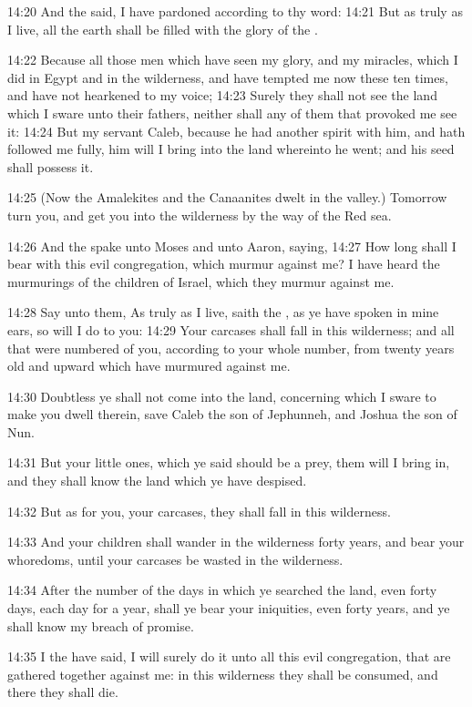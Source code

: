 14:20 And the \LORD said, I have pardoned according to thy word: 14:21
But as truly as I live, all the earth shall be filled with the glory
of the \LORD.

14:22 Because all those men which have seen my glory, and my miracles,
which I did in Egypt and in the wilderness, and have tempted me now
these ten times, and have not hearkened to my voice; 14:23 Surely they
shall not see the land which I sware unto their fathers, neither shall
any of them that provoked me see it: 14:24 But my servant Caleb,
because he had another spirit with him, and hath followed me fully,
him will I bring into the land whereinto he went; and his seed shall
possess it.

14:25 (Now the Amalekites and the Canaanites dwelt in the valley.)
Tomorrow turn you, and get you into the wilderness by the way of the
Red sea.

14:26 And the \LORD spake unto Moses and unto Aaron, saying, 14:27 How
long shall I bear with this evil congregation, which murmur against
me? I have heard the murmurings of the children of Israel, which they
murmur against me.

14:28 Say unto them, As truly as I live, saith the \LORD, as ye have
spoken in mine ears, so will I do to you: 14:29 Your carcases shall
fall in this wilderness; and all that were numbered of you, according
to your whole number, from twenty years old and upward which have
murmured against me.

14:30 Doubtless ye shall not come into the land, concerning which I
sware to make you dwell therein, save Caleb the son of Jephunneh, and
Joshua the son of Nun.

14:31 But your little ones, which ye said should be a prey, them will
I bring in, and they shall know the land which ye have despised.

14:32 But as for you, your carcases, they shall fall in this
wilderness.

14:33 And your children shall wander in the wilderness forty years,
and bear your whoredoms, until your carcases be wasted in the
wilderness.

14:34 After the number of the days in which ye searched the land, even
forty days, each day for a year, shall ye bear your iniquities, even
forty years, and ye shall know my breach of promise.

14:35 I the \LORD have said, I will surely do it unto all this evil
congregation, that are gathered together against me: in this
wilderness they shall be consumed, and there they shall die.

